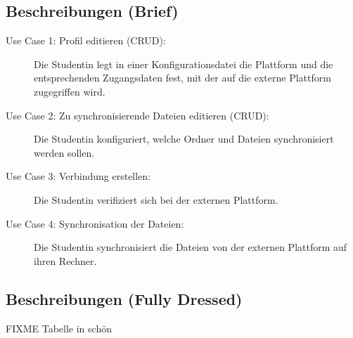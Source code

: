 \documentclass[a4paper]{article}
\begin{document}
\subsection{Beschreibungen (Brief)}
\begin{description}
	
\item[Use Case 1: Profil editieren (CRUD):] Die Studentin legt in einer Konfigurationsdatei die Plattform und die entsprechenden Zugangsdaten fest, mit der auf die externe Plattform zugegriffen wird.

\item[Use Case 2: Zu synchronisierende Dateien editieren (CRUD):] Die Studentin konfiguriert, welche Ordner und Dateien synchronisiert werden sollen.

\item[Use Case 3: Verbindung erstellen:] Die Studentin verifiziert sich bei der externen Plattform.

\item[Use Case 4: Synchronisation der Dateien:] Die Studentin synchronisiert die Dateien von der externen Plattform auf ihren Rechner.
\end{description}

\subsection{Beschreibungen (Fully Dressed)}

FIXME Tabelle in schön
\end{document}
